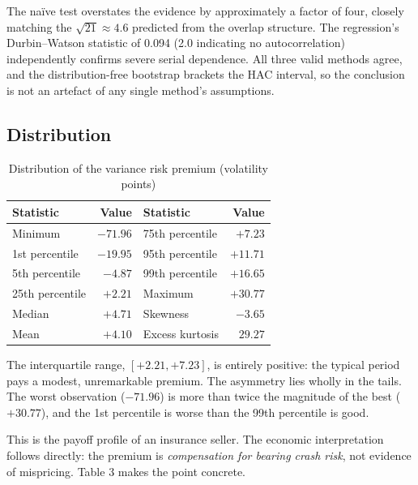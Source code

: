 \documentclass[11pt,a4paper]{article}
\begin{document}
The na\"ive test overstates the evidence by approximately a factor of four, closely matching the
$\sqrt{21}\approx 4.6$ predicted from the overlap structure. The regression's Durbin--Watson statistic
of 0.094 (2.0 indicating no autocorrelation) independently confirms severe serial dependence. All three
valid methods agree, and the distribution-free bootstrap brackets the HAC interval, so the conclusion
is not an artefact of any single method's assumptions.

\subsection{Distribution}

\begin{table}[h]
\centering
\caption{Distribution of the variance risk premium (volatility points)}
\begin{tabular}{@{}lrlr@{}}
\toprule
Statistic & Value & Statistic & Value \\
\midrule
Minimum & $-71.96$ & 75th percentile & $+7.23$ \\
1st percentile & $-19.95$ & 95th percentile & $+11.71$ \\
5th percentile & $-4.87$ & 99th percentile & $+16.65$ \\
25th percentile & $+2.21$ & Maximum & $+30.77$ \\
Median & $+4.71$ & Skewness & $-3.65$ \\
Mean & $+4.10$ & Excess kurtosis & $29.27$ \\
\bottomrule
\end{tabular}
\end{table}

The interquartile range, $[+2.21, +7.23]$, is entirely positive: the typical period pays a modest,
unremarkable premium. The asymmetry lies wholly in the tails. The worst observation ($-71.96$) is more
than twice the magnitude of the best ($+30.77$), and the 1st percentile is worse than the 99th
percentile is good.

This is the payoff profile of an insurance seller. The economic interpretation follows directly: the
premium is \emph{compensation for bearing crash risk}, not evidence of mispricing. Table 3 makes the
point concrete.
\end{document}
